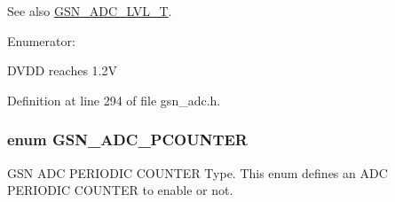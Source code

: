 \begin{DoxySeeAlso}{See also}
\hyperlink{a00643_ga5a94fb4298f40809bab65da9dd446da7}{GSN\_\-ADC\_\-LVL\_\-T}. 
\end{DoxySeeAlso}
\begin{Desc}
\item[Enumerator: ]\par
\begin{description}
\item[{\em 
\hypertarget{a00643_gga3309e4e970c6632c63ec80fb739e7c0ea98944ab6c93079772221f5026e13f5fb}{
GSN\_\-ADC\_\-LVL\_\-DISABLE}
\label{a00643_gga3309e4e970c6632c63ec80fb739e7c0ea98944ab6c93079772221f5026e13f5fb}
}]\item[{\em 
\hypertarget{a00643_gga3309e4e970c6632c63ec80fb739e7c0eab638d1688bcb28d51c197aa91dff4c15}{
GSN\_\-ADC\_\-LVL\_\-ENABLE}
\label{a00643_gga3309e4e970c6632c63ec80fb739e7c0eab638d1688bcb28d51c197aa91dff4c15}
}]DVDD reaches 1.2V \end{description}
\end{Desc}



Definition at line 294 of file gsn\_\-adc.h.

\hypertarget{a00643_gab6f216973f783f72673e41fefdcd0019}{
\subsubsection[{GSN\_\-ADC\_\-PCOUNTER}]{\setlength{\rightskip}{0pt plus 5cm}enum {\bf GSN\_\-ADC\_\-PCOUNTER}}}
\label{a00643_gab6f216973f783f72673e41fefdcd0019}


GSN ADC PERIODIC COUNTER Type. This enum defines an ADC PERIODIC COUNTER to enable or not. 

